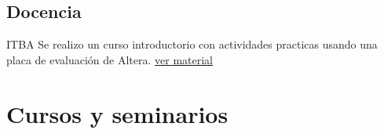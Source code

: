 \documentclass[11pt,a4paper,sans]{moderncv} 	%
\begin{document}
	\subsection{Docencia}
	 	{ITBA} 		{}{}{Se realizo un curso introductorio con actividades practicas usando una placa de evaluación de Altera. \href{http://disenioconingenio.com.ar/shop/docs/fpga.pdf} {ver material}}


\section{Cursos y seminarios}
\end{document}
